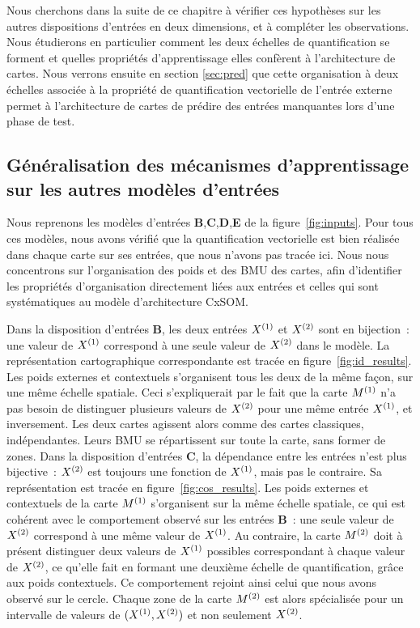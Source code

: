 \documentclass[../main]{subfiles}
\begin{document}
Nous cherchons dans la suite de ce chapitre à vérifier ces hypothèses sur les autres dispositions d'entrées en deux dimensions, et à compléter les observations.
Nous étudierons en particulier comment les deux échelles de quantification se forment et quelles propriétés d'apprentissage elles confèrent à l'architecture de cartes.
Nous verrons ensuite en section \ref{sec:pred} que cette organisation à deux échelles associée à la propriété de quantification vectorielle de l'entrée externe permet à l'architecture de cartes de prédire des entrées manquantes lors d'une phase de test.

\subsection{Généralisation des mécanismes d'apprentissage sur les autres modèles d'entrées}

Nous reprenons les modèles d'entrées \textbf{B},\textbf{C},\textbf{D},\textbf{E} de la figure~\ref{fig:inputs}.
Pour tous ces modèles, nous avons vérifié que la quantification vectorielle est bien réalisée dans chaque carte sur ses entrées, que nous n'avons pas tracée ici.
Nous nous concentrons sur l'organisation des poids et des BMU des cartes, afin d'identifier les propriétés d'organisation directement liées aux entrées et celles qui sont systématiques au modèle d'architecture CxSOM.

Dans la disposition d'entrées \textbf{B}, les deux entrées $X^{({1})}$ et $X^{({2})}$ sont en bijection~: une valeur de $X^{({1})}$ correspond à une seule valeur de $X^{({2})}$ dans le modèle.
La représentation cartographique correspondante est tracée en figure~\ref{fig:id_results}.
Les poids externes et contextuels s'organisent tous les deux de la même façon, sur une même échelle spatiale. Ceci s'expliquerait par le fait que la carte $M^{({1})}$ n'a pas besoin de distinguer plusieurs valeurs de $X^{({2})}$ pour une même entrée $X^{({1})}$, et inversement. Les deux cartes agissent alors comme des cartes classiques, indépendantes. Leurs BMU se répartissent sur toute la carte, sans former de zones.
Dans la disposition d'entrées \textbf{C}, la dépendance entre les entrées n'est plus bijective~: $X^{({2})}$ est toujours une fonction de $X^{({1})}$, mais pas le contraire. Sa représentation est tracée en figure~\ref{fig:cos_results}.
Les poids externes et contextuels de la carte $M^{({1})}$ s'organisent sur la même échelle spatiale, ce qui est cohérent avec le comportement observé sur les entrées \textbf{B}~: une seule valeur de $X^{({2})}$ correspond à une même valeur de $X^{({1})}$.
Au contraire, la carte $M^{({2})}$ doit à présent distinguer deux valeurs de $X^{({1})}$ possibles correspondant à chaque valeur de $X^{({2})}$, ce qu'elle fait en formant une deuxième échelle de quantification, grâce aux poids contextuels. Ce comportement rejoint ainsi celui que nous avons observé sur le cercle. Chaque zone de la carte $M^{({2})}$ est alors spécialisée pour un intervalle de valeurs de $(X^{({1})}, X^{({2})})$ et non seulement $X^{({2})}$.
\end{document}
